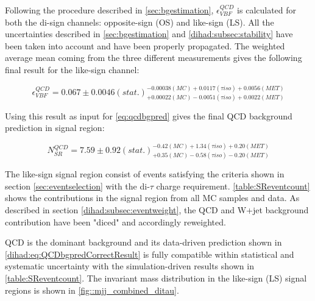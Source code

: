 Following the procedure described in \autoref{sec:bgestimation}, $\epsilon^{QCD}_{VBF}$ is calculated for both the di-\hadtau sign channels: opposite-sign (OS) and like-sign (LS). All the uncertainties described in \autoref{sec:bgestimation} and \autoref{dihad:subsec:stability} have been taken into account and have been properly propagated. The weighted average mean coming from the three different measurements gives the following final result for the like-sign channel:

\begin{equation}
\epsilon^{QCD}_{VBF} = 0.067\pm0.0046(stat.)^{-0.00038(MC)+0.0117(\tau iso)+0.0056(MET)}_{+0.00022(MC)-0.0051(\tau iso)+0.0022(MET)}
\label{eq:vbfefflsresult}
\end{equation}

Using this result as input for \autoref{eq:qcdbgpred} gives the final QCD background prediction in signal region:

\begin{equation}
N^{QCD}_{SR} = 7.59\pm0.92(stat.)^{-0.42(MC)+1.34(\tau iso)+0.20(MET)}_{+0.35(MC)-0.58(\tau iso)-0.20(MET)}
\label{dihad:eq:QCDbgpredCorrectResult}
\end{equation}

The like-sign signal region consist of events satisfying the criteria shown in section \ref{sec:eventselection} with the di-$\tau$ charge requirement. \autoref{table:SReventcount} shows the contributions in the signal region from all MC samples and data. As described in section \ref{dihad:subsec:eventweight}, the QCD and W+jet  background contribution have been "diced" and accordingly reweighted. 

QCD is the dominant background and its data-driven prediction shown in \autoref{dihad:eq:QCDbgpredCorrectResult} is fully compatible within statistical and systematic uncertainty with the simulation-driven results shown in \autoref{table:SReventcount}. The \mjj invariant mass distribution in the like-sign (LS) \hadtau \hadtau signal regions is shown in \autoref{fig::mjj_combined_ditau}.

